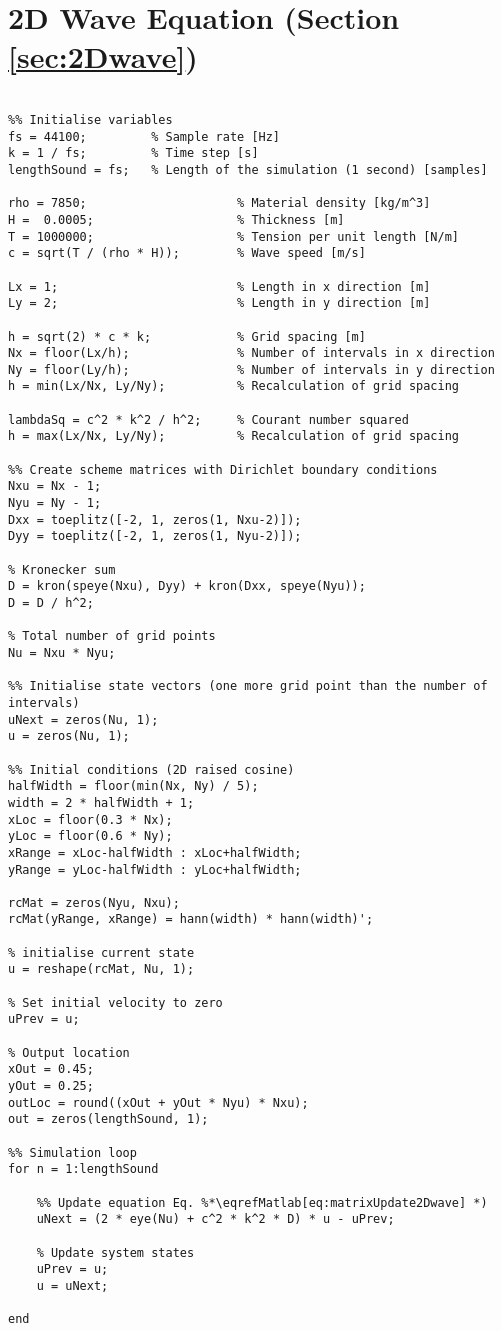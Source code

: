 \section{2D Wave Equation (Section \ref{sec:2Dwave})}
\label{app:2DWave}
\begin{lstlisting}

%% Initialise variables
fs = 44100;         % Sample rate [Hz]
k = 1 / fs;         % Time step [s]
lengthSound = fs;   % Length of the simulation (1 second) [samples]             

rho = 7850;                     % Material density [kg/m^3]
H =  0.0005;                    % Thickness [m]
T = 1000000;                    % Tension per unit length [N/m]
c = sqrt(T / (rho * H));        % Wave speed [m/s]

Lx = 1;                         % Length in x direction [m]
Ly = 2;                         % Length in y direction [m]

h = sqrt(2) * c * k;            % Grid spacing [m]
Nx = floor(Lx/h);               % Number of intervals in x direction
Ny = floor(Ly/h);               % Number of intervals in y direction
h = min(Lx/Nx, Ly/Ny);          % Recalculation of grid spacing

lambdaSq = c^2 * k^2 / h^2;     % Courant number squared
h = max(Lx/Nx, Ly/Ny);          % Recalculation of grid spacing

%% Create scheme matrices with Dirichlet boundary conditions 
Nxu = Nx - 1;
Nyu = Ny - 1;
Dxx = toeplitz([-2, 1, zeros(1, Nxu-2)]);
Dyy = toeplitz([-2, 1, zeros(1, Nyu-2)]);

% Kronecker sum
D = kron(speye(Nxu), Dyy) + kron(Dxx, speye(Nyu));
D = D / h^2;

% Total number of grid points
Nu = Nxu * Nyu;
    
%% Initialise state vectors (one more grid point than the number of intervals)
uNext = zeros(Nu, 1); 
u = zeros(Nu, 1);

%% Initial conditions (2D raised cosine)
halfWidth = floor(min(Nx, Ny) / 5);
width = 2 * halfWidth + 1;
xLoc = floor(0.3 * Nx);
yLoc = floor(0.6 * Ny);
xRange = xLoc-halfWidth : xLoc+halfWidth;
yRange = yLoc-halfWidth : yLoc+halfWidth;

rcMat = zeros(Nyu, Nxu);
rcMat(yRange, xRange) = hann(width) * hann(width)';

% initialise current state  
u = reshape(rcMat, Nu, 1); 

% Set initial velocity to zero
uPrev = u;

% Output location
xOut = 0.45;
yOut = 0.25;
outLoc = round((xOut + yOut * Nyu) * Nxu);
out = zeros(lengthSound, 1);

%% Simulation loop
for n = 1:lengthSound
    
    %% Update equation Eq. %*\eqrefMatlab[eq:matrixUpdate2Dwave] *)
    uNext = (2 * eye(Nu) + c^2 * k^2 * D) * u - uPrev;
    
    % Update system states
    uPrev = u;
    u = uNext;
    
end
\end{lstlisting}
